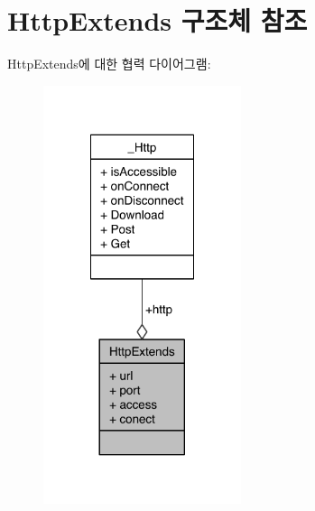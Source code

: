 \hypertarget{struct_http_extends}{\section{Http\-Extends 구조체 참조}
\label{struct_http_extends}
}


Http\-Extends에 대한 협력 다이어그램\-:\nopagebreak
\begin{figure}[H]
\begin{center}
\leavevmode
\includegraphics[width=164pt]{struct_http_extends__coll__graph}
\end{center}
\end{figure}
